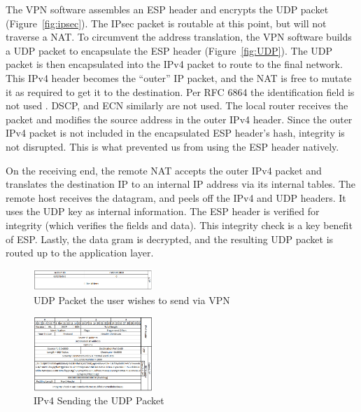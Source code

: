 \documentclass[conference,12pt]{IEEEtran}
\begin{document}
The VPN software assembles an ESP header and encrypts the UDP packet (Figure~\ref{fig:ipsec}).  The IPsec
packet is routable at this point, but will not traverse a NAT.  To circumvent
the address translation, the VPN software builds a UDP packet to encapsulate the
ESP header (Figure~\ref{fig:UDP}).  The UDP packet is then encapsulated into the
IPv4 packet to route to the final network. This IPv4 header becomes the
``outer'' IP packet, and the NAT is free to mutate it as required to get it to the
destination. Per RFC 6864 the identification field is not used
\autocite{rfc6864}. DSCP, and ECN
similarly are not used. The local router receives the packet and modifies the source address
 in the outer IPv4 header. Since the outer IPv4 packet is not included in the
 encapsulated ESP header's hash, integrity is not disrupted. This is what
 prevented us from using the ESP
header natively. 

On the receiving end, the remote NAT accepts the outer IPv4 packet and
translates the destination IP to an internal IP address via its internal
tables.  The remote host receives the datagram, and peels off the IPv4 and
UDP headers. It uses the UDP key as internal information.  The ESP header is
verified for integrity (which verifies the fields and data).  This integrity
check is a key benefit of ESP. Lastly, the data gram is
decrypted, and the resulting UDP packet is routed up to the application layer.


\begin{figure}
\centering
\includegraphics[width=0.4\textwidth]{udp_1.png}
\caption{UDP Packet the user wishes to send via VPN}
\label{fig:udp}
\end{figure}

\begin{figure}
\centering
\includegraphics[width=0.4\textwidth]{ip4_4.png}
\caption{IPv4 Sending the UDP Packet}
\label{fig:outer_ip}
\end{figure}
\end{document}
